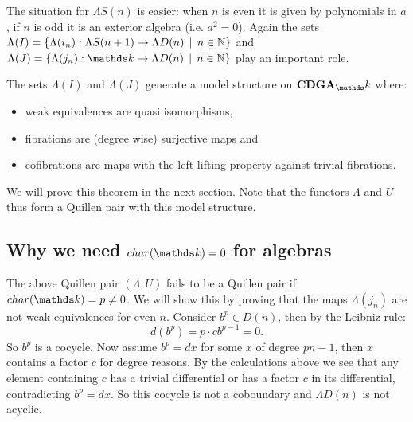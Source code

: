 The situation for $\Lambda S(n)$ is easier: when $n$ is even it is given by polynomials in $a$, if $n$ is odd it is an exterior algebra (i.e. $a^2 = 0$). Again the sets $\Lambda(I) = \{ \Lambda(i_n) : \Lambda S(n+1) \to \Lambda D(n) \,\mid\, n \in \mathbb{N}\}$ and $\Lambda(J) = \{ \Lambda(j_n) : \k \to \Lambda D(n) \I n \in \N\}$ play an important role.

\begin{theorem}
	The sets $\Lambda(I)$ and $\Lambda(J)$ generate a model structure on $\CDGA_\k$ where:
	\begin{itemize}
		\item weak equivalences are quasi isomorphisms,
		\item fibrations are (degree wise) surjective maps and
		\item cofibrations are maps with the left lifting property against trivial fibrations.
	\end{itemize}
\end{theorem}

We will prove this theorem in the next section. Note that the functors $\Lambda$ and $U$ thus form a Quillen pair with this model structure.

\subsection{Why we need $\Char{\k} = 0$ for algebras}
The above Quillen pair $(\Lambda, U)$ fails to be a Quillen pair if $\Char{\k} = p \neq 0$. We will show this by proving that the maps $\Lambda(j_n)$ are not weak equivalences for even $n$. Consider $b^p \in D(n)$, then by the Leibniz rule:
$$ d(b^p) = p \cdot c b^{p-1} = 0. $$
So $b^p$ is a cocycle. Now assume $b^p = d x$ for some $x$ of degree $p n - 1$, then $x$ contains a factor $c$ for degree reasons. By the calculations above we see that any element containing $c$ has a trivial differential or has a factor $c$ in its differential, contradicting $b^p =  d x$. So this cocycle is not a coboundary and $\Lambda D(n)$ is not acyclic.
